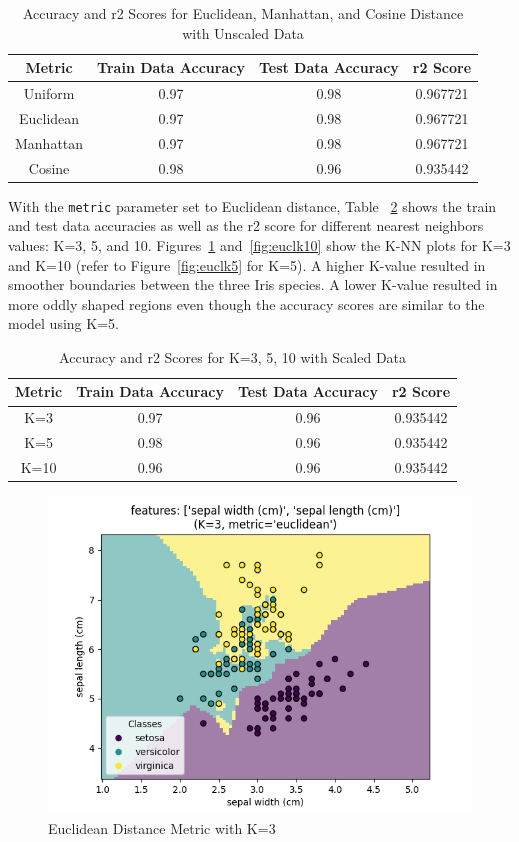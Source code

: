 \documentclass[journal]{IEEEtran}
\begin{document}
\begin{table}[h!]
\centering
\begin{tabular}{ c | c c c }
Metric & Train Data Accuracy & Test Data Accuracy & r2 Score \\
\hline
Uniform & 0.97 & 0.98 & 0.967721 \\
Euclidean & 0.97 & 0.98 & 0.967721 \\
Manhattan & 0.97 & 0.98 & 0.967721 \\
Cosine & 0.98 & 0.96 & 0.935442 \\
\end{tabular}
\caption{Accuracy and r2 Scores for Euclidean, Manhattan, and Cosine Distance with Unscaled Data}
\label{table:accur5unscaled}
\end{table}

With the \lstinline{metric} parameter set to Euclidean distance, Table ~\ref{table:accurkscaled} shows the train and test data accuracies as well as the r2 score for different nearest neighbors values: K=3, 5, and 10. Figures~\ref{fig:euclk3} and~\ref{fig:euclk10} show the K-NN plots for K=3 and K=10 (refer to Figure~\ref{fig:euclk5} for K=5). A higher K-value resulted in smoother boundaries between the three Iris species. A lower K-value resulted in more oddly shaped regions even though the accuracy scores are similar to the model using K=5. 

\begin{table}[h!]
\centering
\begin{tabular}{ c | c c c }
Metric & Train Data Accuracy & Test Data Accuracy & r2 Score \\
\hline
K=3 & 0.97 & 0.96 & 0.935442 \\
K=5 & 0.98 & 0.96 & 0.935442 \\
K=10 & 0.96 & 0.96 & 0.935442 \\
\end{tabular}
\caption{Accuracy and r2 Scores for K=3, 5, 10 with Scaled Data}
\label{table:accurkscaled}
\end{table}

\begin{figure}[h!]
\includegraphics[scale=0.5]{euclidean_k3.png}
\centering
\caption{Euclidean Distance Metric with K=3}
\label{fig:euclk3}
\end{figure}
\end{document}
